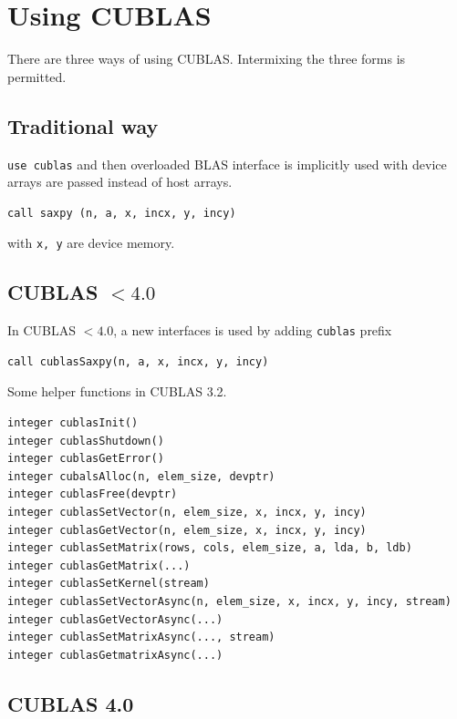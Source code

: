 \section{Using CUBLAS}
\label{sec:using-cublas}

There are three ways of using CUBLAS. Intermixing the three forms is
permitted. 

\subsection{Traditional way}
\label{sec:traditional-way}

 \verb!use cublas! and then overloaded BLAS interface is
implicitly used with device arrays are passed instead of host arrays.
\begin{lstlisting}
call saxpy (n, a, x, incx, y, incy)
\end{lstlisting}
with \verb!x, y! are device memory. 

\subsection{CUBLAS $< 4.0$}
\label{sec:cublas--4.0}

In CUBLAS $< 4.0$, a new interfaces is used by adding \verb!cublas!
prefix
\begin{lstlisting}
call cublasSaxpy(n, a, x, incx, y, incy)
\end{lstlisting}

Some helper functions in CUBLAS 3.2.
\begin{lstlisting}
integer cublasInit()
integer cublasShutdown()
integer cublasGetError()
integer cubalsAlloc(n, elem_size, devptr)
integer cublasFree(devptr)
integer cublasSetVector(n, elem_size, x, incx, y, incy)
integer cublasGetVector(n, elem_size, x, incx, y, incy)
integer cublasSetMatrix(rows, cols, elem_size, a, lda, b, ldb)
integer cublasGetMatrix(...)
integer cublasSetKernel(stream)
integer cublasSetVectorAsync(n, elem_size, x, incx, y, incy, stream)
integer cublasGetVectorAsync(...)
integer cublasSetMatrixAsync(..., stream)
integer cublasGetmatrixAsync(...)
\end{lstlisting}

\subsection{CUBLAS 4.0}
\label{sec:cublas-4.0}

